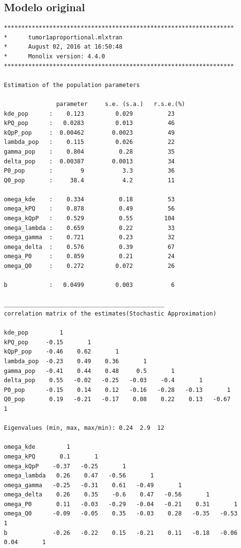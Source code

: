 \documentclass[letterpaper,12pt]{article}
\theoremstyle{definition} \newtheorem{Def}{Definición}[section]
\theoremstyle{definition} \newtheorem{Teo}{Teorema}[section]
\theoremstyle{definition} \newtheorem{Pro}{Proposición}
\theoremstyle{definition} \newtheorem{Lema}{Lema}[section]
\theoremstyle{definition} \newtheorem{Cor}{Corolario}[section]
\begin{document}
\subsection{Modelo original}

\begin{verbatim}
******************************************************************
*      tumor1aproportional.mlxtran
*      August 02, 2016 at 16:50:48
*      Monolix version: 4.4.0
******************************************************************

Estimation of the population parameters

               parameter     s.e. (s.a.)   r.s.e.(%) 
kde_pop      :    0.123         0.029          23    
kPQ_pop      :   0.0283         0.013          46    
kQpP_pop     :  0.00462        0.0023          49    
lambda_pop   :    0.115         0.026          22    
gamma_pop    :    0.804          0.28          35    
delta_pop    :  0.00387        0.0013          34    
P0_pop       :        9           3.3          36    
Q0_pop       :     38.4           4.2          11    

omega_kde    :    0.334          0.18          53    
omega_kPQ    :    0.878          0.49          56    
omega_kQpP   :    0.529          0.55         104    
omega_lambda :    0.659          0.22          33    
omega_gamma  :    0.721          0.23          32    
omega_delta  :    0.576          0.39          67    
omega_P0     :    0.859          0.21          24    
omega_Q0     :    0.272         0.072          26    

b            :   0.0499         0.003           6    

______________________________________________
correlation matrix of the estimates(Stochastic Approximation)

kde_pop         1                      
kPQ_pop     -0.15       1                   
kQpP_pop    -0.46    0.62       1                
lambda_pop  -0.23    0.49    0.36       1             
gamma_pop   -0.41    0.44    0.48     0.5       1          
delta_pop    0.55   -0.02   -0.25   -0.03    -0.4       1       
P0_pop      -0.15    0.14    0.12   -0.16   -0.28   -0.13       1    
Q0_pop       0.19   -0.21   -0.17    0.08    0.22    0.13   -0.67       1 

Eigenvalues (min, max, max/min): 0.24  2.9  12

omega_kde         1                         
omega_kPQ       0.1       1                      
omega_kQpP    -0.37   -0.25       1                   
omega_lambda   0.26    0.47   -0.56       1                
omega_gamma   -0.25   -0.31    0.61   -0.49       1             
omega_delta    0.26    0.35    -0.6    0.47   -0.56       1          
omega_P0       0.11   -0.03   -0.29   -0.04   -0.21    0.31       1       
omega_Q0      -0.09   -0.05    0.35   -0.03    0.28   -0.35   -0.53       1    
b             -0.26   -0.22    0.15   -0.21    0.11   -0.18   -0.06    0.04       1 


\end{verbatim}
\end{document}
